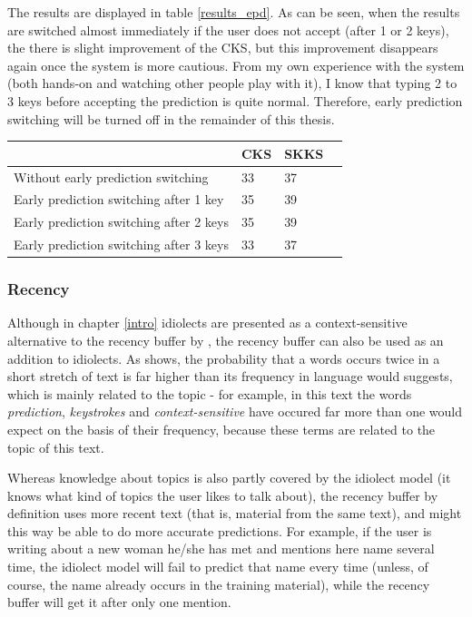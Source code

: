 \documentclass[12pt]{article}
\let\originaltable\table
\let\endoriginaltable\endtable
\renewenvironment{table}[1][ht]{%
  \originaltable[#1]
  \centering}%
  {\endoriginaltable}
\begin{document}
The results are displayed in table \ref{results_epd}. As can be seen, when the results are switched almost immediately if the user does not accept (after 1 or 2 keys), the there is slight improvement of the CKS, but this improvement disappears again once the system is more cautious. From my own experience with the system (both hands-on and watching other people play with it), I know that typing 2 to 3 keys before accepting the prediction is quite normal. Therefore, early prediction switching will be turned off in the remainder of this thesis.

\begin{table}[h]
\begin{tabular}{l|lll} 

&CKS&SKKS\\
\hline
Without early prediction switching&33&37\\
Early prediction switching after 1 key&35&39\\
Early prediction switching after 2 keys&35&39\\
Early prediction switching after 3 keys&33&37\\
\end{tabular} 
\caption{Percentage of keystrokes saved with and without early prediction switching.} \label{results_epd}
\end{table}

\subsubsection{Recency} \label{rb}

Although in chapter \ref{intro} idiolects are presented as a context-sensitive alternative to the recency buffer by , the recency buffer can also be used as an addition to idiolects. As  shows, the probability that a words occurs twice in a short stretch of text is far higher than its  frequency in language would suggests, which is mainly related to the topic - for example, in this text the words \emph{prediction}, \emph{keystrokes} and \emph{context-sensitive} have occured far more than one would expect on the basis of their frequency, because these terms are related to the topic of this text. 

Whereas knowledge about topics is also partly covered by the idiolect model (it knows what kind of topics the user likes to talk about), the recency buffer by definition uses more recent text (that is, material from the same text), and might this way be able to do more accurate predictions. For example, if the user is writing about a new woman he/she has met and mentions here name several time, the idiolect model will fail to predict that name every time (unless, of course, the name already occurs in the training material), while the recency buffer will get it after only one mention.
\end{document}
